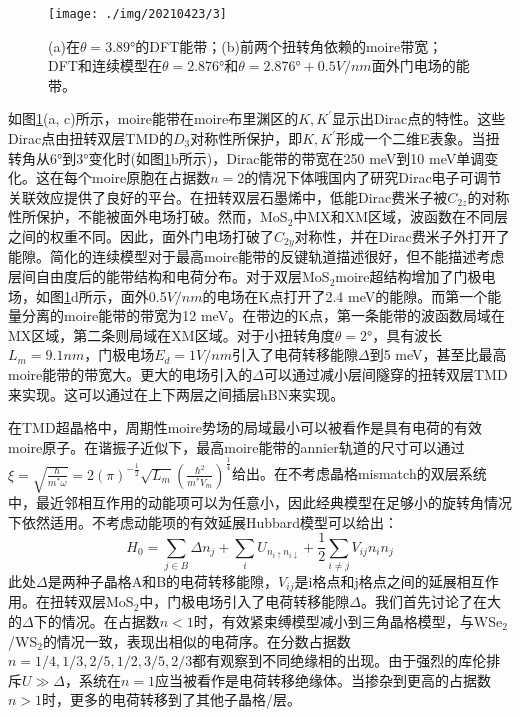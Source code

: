 \documentclass[reprint, aps, prb, showkeys]{revtex4-2}
\begin{document}
\begin{figure}[t]
    \texttt{[image: ./img/20210423/3]}
    \caption{\label{fig:bandStructure} 
    (a)在$\theta = 3.89°$的DFT能带；(b)前两个扭转角依赖的moire带宽；DFT和连续模型在$\theta = 2.876°$和$\theta = 2.876° + 0.5V/nm$面外门电场的能带。
    }
\end{figure}

如图\ref{fig:bandStructure}(a, c)所示，moire能带在moire布里渊区的$K,K^{'}$显示出Dirac点的特性。这些Dirac点由扭转双层TMD的$D_3$对称性所保护，即$K,K^{'}$形成一个二维E表象。当扭转角从6°到3°变化时(如图\ref{fig:bandStructure}b所示)，Dirac能带的带宽在250 meV到10 meV单调变化。这在每个moire原胞在占据数$n = 2$的情况下体哦国内了研究Dirac电子可调节关联效应提供了良好的平台。在扭转双层石墨烯中，低能Dirac费米子被$C_{2z}$的对称性所保护，不能被面外电场打破。然而，MoS$_2$中MX和XM区域，波函数在不同层之间的权重不同。因此，面外门电场打破了$C_{2y}$对称性，并在Dirac费米子外打开了能隙。简化的连续模型对于最高moire能带的反键轨道描述很好，但不能描述考虑层间自由度后的能带结构和电荷分布。对于双层MoS$_2$moire超结构增加了门极电场，如图\ref{fig:bandStructure}d所示，面外0.5$V/nm$的电场在K点打开了2.4 meV的能隙。而第一个能量分离的moire能带的带宽为12 meV。在带边的K点，第一条能带的波函数局域在MX区域，第二条则局域在XM区域。对于小扭转角度$\theta = 2°$，具有波长$L_m = 9.1 nm$，门极电场$E_d = 1V/nm$引入了电荷转移能隙$\Delta$到5 meV，甚至比最高moire能带的带宽大。更大的电场引入的$\Delta$可以通过减小层间隧穿的扭转双层TMD来实现。这可以通过在上下两层之间插层hBN来实现。

在TMD超晶格中，周期性moire势场的局域最小可以被看作是具有电荷的有效moire原子。在谐振子近似下，最高moire能带的annier轨道的尺寸可以通过$\xi = \sqrt{\frac{\hbar}{m^{*}\omega}} = 2(\pi)^{-\frac{1}{2}}\sqrt{L_m}(\frac{\hbar^2}{m^{*}V_m})^{\frac{1}{4}}$给出。在不考虑晶格mismatch的双层系统中，最近邻相互作用的动能项可以为任意小，因此经典模型在足够小的旋转角情况下依然适用。不考虑动能项的有效延展Hubbard模型可以给出：
\begin{equation}
    H_0 = \sum_{j \in B}\Delta n_j + \sum_i U_{n_{i \uparrow} n_{i \downarrow}} + \frac{1}{2} \sum_{i \neq j} V_{ij} n_i n_j
\end{equation}
此处$\Delta$是两种子晶格A和B的电荷转移能隙，$V_{ij}$是i格点和j格点之间的延展相互作用。在扭转双层MoS$_2$中，门极电场引入了电荷转移能隙$\Delta$。我们首先讨论了在大的$\Delta$下的情况。在占据数$n < 1$时，有效紧束缚模型减小到三角晶格模型，与WSe$_2$/WS$_2$的情况一致，表现出相似的电荷序。在分数占据数$n = 1/4, 1/3, 2/5, 1/2, 3/5, 2/3$都有观察到不同绝缘相的出现。由于强烈的库伦排斥$U \gg \Delta$，系统在$n = 1$应当被看作是电荷转移绝缘体。当掺杂到更高的占据数$n > 1$时，更多的电荷转移到了其他子晶格/层。
\end{document}
